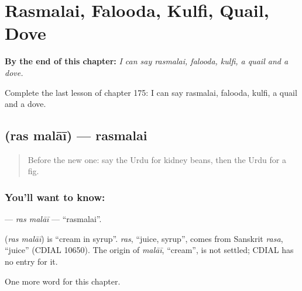 
\chapter{Rasmalai, Falooda, Kulfi, Quail, Dove}
\label{ch:ur-rasmalai-falooda-kulfi-quail-dove}

\begin{chapteropening}
\textbf{By the end of this chapter:} \emph{I can say rasmalai, falooda, kulfi, a quail and a dove.}

Complete the last lesson of chapter 175: I can say rasmalai, falooda, kulfi, a quail and a dove.
\end{chapteropening}

\section[\texorpdfstring{\ur{رس} \ur{ملائی} (ras malāī)}{رس ملائی (ras malāī)}]{  (ras malāī) — rasmalai}

\label{lesson:UR-C175-ras-malai}



\begin{quote}
Before the new one: say the Urdu for kidney beans, then the Urdu for a fig.
\end{quote}

\subsection*{You'll want to know:  }
\textbf{ } — \emph{ras malāī} — \textquotedblleft{}rasmalai\textquotedblright{}.

\begin{cousinweb}
\textbf{ } (\emph{ras malāī}) is \textquotedblleft{}cream in syrup\textquotedblright{}. \emph{ras}, \textquotedblleft{}juice, syrup\textquotedblright{}, comes from Sanskrit \emph{rasa}, \textquotedblleft{}juice\textquotedblright{} (CDIAL 10650). The origin of \emph{malāī}, \textquotedblleft{}cream\textquotedblright{}, is not settled; CDIAL has no entry for it.
\end{cousinweb}

\begin{grammarlens}[title={What you've built}]
One more word for this chapter.
\end{grammarlens}

